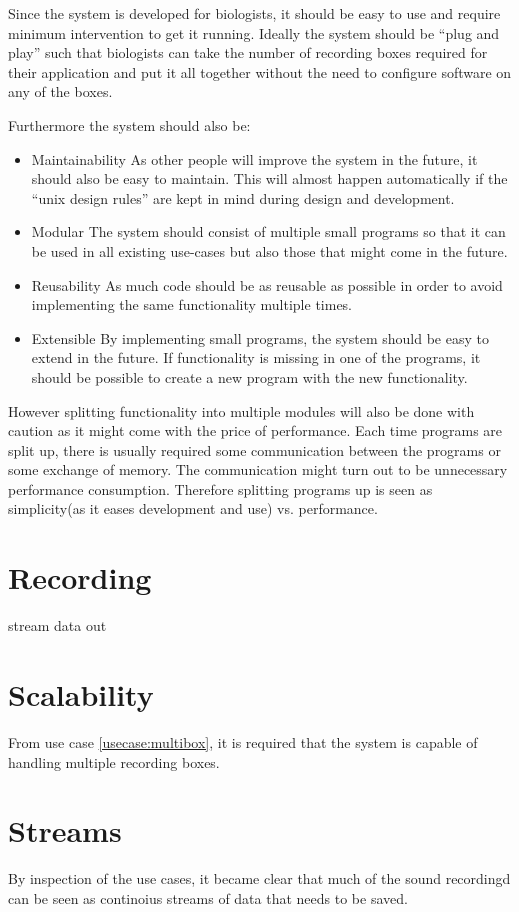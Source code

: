 Since the system is developed for biologists, it should be easy to use and require minimum intervention to get it running. Ideally the system should be “plug and play” such that biologists can take the number of recording boxes required for their application and put it all together without the need to configure software on any of the boxes.

Furthermore the system should also be:

\begin{itemize}
	\item Maintainability
As other people will improve the system in the future, it should also be easy to maintain. This will almost happen automatically if the “unix design rules” are kept in mind during design and development.
\item Modular
The system should consist of multiple small programs so that it can be used in all existing use-cases but also those that might come in the future.
\item Reusability
As much code should be as reusable as possible in order to avoid implementing the same functionality multiple times.
\item Extensible
    By implementing small programs, the system should be easy to extend in the future.
    If functionality is missing in one of the programs, it should be possible to create a new 
    program with the new functionality.
\end{itemize}

However splitting functionality into multiple modules will also be done with caution as it might come with the price of performance. Each time programs are split up, there is usually required some communication between the programs or some exchange of memory. The communication might turn out to be unnecessary performance consumption. Therefore splitting programs up is seen as simplicity(as it eases development and use) vs. performance.

\section{Recording}
stream data out
	
\section{Scalability}
From use case \ref{usecase:multibox}, it is required that the system is capable of handling multiple recording boxes.

\section{Streams}
By inspection of the use cases, it became clear that much of the sound recordingd can be seen as continoius streams of data that needs to be saved.
	
